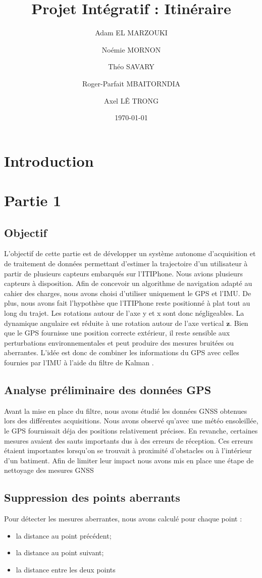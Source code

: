 \documentclass{article}
\title{Projet Intégratif : Itinéraire}
\author{Adam EL MARZOUKI \and Noémie MORNON \and Théo SAVARY \and Roger-Parfait MBAITORNDIA \and Axel LÊ TRONG}
\date{\today}
\begin{document}
\maketitle
\tableofcontents
\newpage
\section{Introduction}
\section{Partie 1}
\subsection{Objectif}
L'objectif de cette partie est de développer un système autonome d'acquisition et de traitement de données permettant d'estimer la trajectoire d'un utilisateur à partir de plusieurs capteurs embarqués sur l'ITIPhone. Nous avions plusieurs capteurs à disposition. Afin de concevoir un algorithme de navigation adapté au cahier des charges, nous avons choisi d'utiliser uniquement le GPS et l'IMU.
De plus, nous avons fait l'hypothèse que l'ITIPhone reste positionné à plat tout au long du trajet. Les rotations autour de l'axe y et x sont donc négligeables. La dynamique angulaire est réduite à une rotation autour de l'axe vertical $\mathbf{z}$. 
Bien que le GPS fournisse une position correcte extérieur, il reste sensible aux perturbations environnementales et peut produire des mesures bruitées ou aberrantes. L'idée est donc de combiner les informations du GPS avec celles fournies par l'IMU à l'aide du filtre de Kalman . 

\subsection{Analyse préliminaire des données GPS}
Avant la mise en place du filtre, nous avons étudié les données GNSS obtenues lors des différentes acquisitions. Nous avons observé qu'avec une météo ensoleillée, le GPS fournissait déja des positions relativement précises. En revanche, certaines mesures avaient des sauts importants dus à des erreurs de réception. Ces erreurs étaient importantes lorsqu'on se trouvait à proximité d'obstacles ou à l'intérieur d'un batiment. Afin de limiter leur impact nous avons mis en place une étape de nettoyage des mesures GNSS

\subsection{Suppression des points aberrants}
Pour détecter les mesures aberrantes, nous avons calculé pour chaque point : 
\begin{itemize}
    \item la distance au point précédent;
    \item la distance au point suivant;
    \item la distance entre les deux points
\end{itemize}
\end{document}

